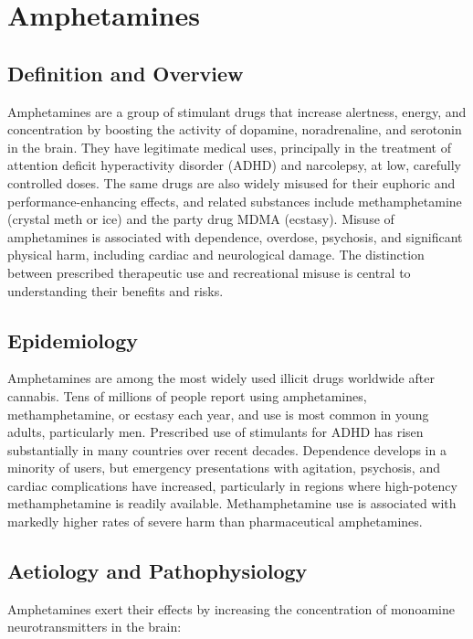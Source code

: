 \chapter{Amphetamines}

\section*{Definition and Overview}
Amphetamines are a group of stimulant drugs that increase alertness, energy, and concentration by boosting the activity of dopamine, noradrenaline, and serotonin in the brain. They have legitimate medical uses, principally in the treatment of attention deficit hyperactivity disorder (ADHD) and narcolepsy, at low, carefully controlled doses. The same drugs are also widely misused for their euphoric and performance-enhancing effects, and related substances include methamphetamine (crystal meth or ice) and the party drug MDMA (ecstasy). Misuse of amphetamines is associated with dependence, overdose, psychosis, and significant physical harm, including cardiac and neurological damage. The distinction between prescribed therapeutic use and recreational misuse is central to understanding their benefits and risks.

\section*{Epidemiology}
Amphetamines are among the most widely used illicit drugs worldwide after cannabis. Tens of millions of people report using amphetamines, methamphetamine, or ecstasy each year, and use is most common in young adults, particularly men. Prescribed use of stimulants for ADHD has risen substantially in many countries over recent decades. Dependence develops in a minority of users, but emergency presentations with agitation, psychosis, and cardiac complications have increased, particularly in regions where high-potency methamphetamine is readily available. Methamphetamine use is associated with markedly higher rates of severe harm than pharmaceutical amphetamines.

\section*{Aetiology and Pathophysiology}
Amphetamines exert their effects by increasing the concentration of monoamine neurotransmitters in the brain:

